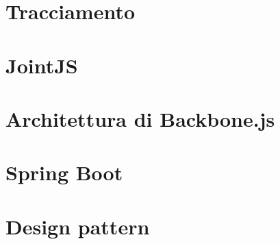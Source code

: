 % 

\section{Tracciamento}




\appendix

\section{JointJS} \label{sec:app_jointjs}


\section{Architettura di Backbone.js}


\section{Spring Boot}


\section{Design pattern} \label{sec:app_creaz}



